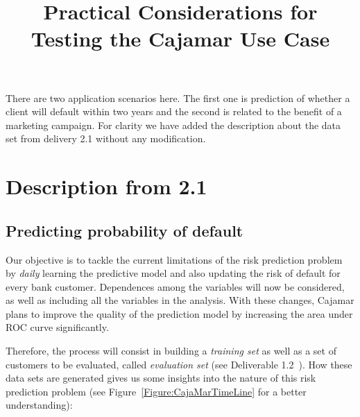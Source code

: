 \documentclass{article}
\title{Practical Considerations for Testing the Cajamar Use Case}
\date{}
\theoremstyle{theorem}
\theoremstyle{definition}
\begin{document}
\maketitle

There are two application scenarios here.  The first one is prediction of whether a client will default within two years and the second is related to the benefit of a marketing campaign. For clarity we have added the description about the data set from delivery 2.1 without any modification.

\section{Description from 2.1}

\subsection{Predicting probability of default} \label{SubSection:Predicting}

Our objective is to tackle the current limitations of the risk prediction problem by \textit{daily} learning the predictive model and also updating the risk of default for every bank customer. Dependences among the variables will now be considered, as well as including all the variables in the analysis. With these changes, Cajamar plans to improve the quality of the prediction model by increasing the area under ROC curve significantly.


Therefore, the process will consist in building a \textit{training set} as well as a set of customers to be evaluated, called \textit{evaluation set} (see Deliverable 1.2~\cite{Fer14b}). How these data sets are generated gives us some insights into the nature of this risk prediction problem (see Figure~\ref{Figure:CajaMarTimeLine} for a better understanding):

\end{document}
